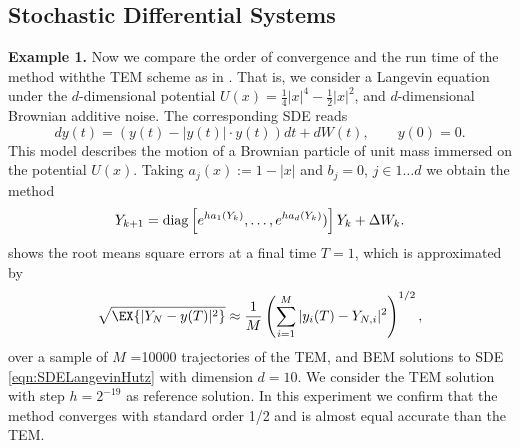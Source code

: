 \subsection{Stochastic Differential Systems}
{\textbf{Example 1.}}
Now we compare the order of convergence
and the run time of the \SM method withthe TEM scheme as in \cite{Hutzenthaler2012a}. That is,
we consider a  Langevin equation under  the $d$-dimensional potential 
$U(x)= \frac{1}{4}|x|^4 - \frac{1}{2}|x|^2$, and $d$-dimensional Brownian additive noise. The corresponding
SDE reads
\begin{equation}\label{eqn:SDELangevinHutz}
dy(t) = 
\left(
y(t) - |y(t)| \cdot y(t)
\right)dt
+dW(t), \qquad y(0)=0.
\end{equation}
This model describes the motion of a Brownian particle of unit mass immersed on the potential $U(x)$. 
Taking $a_j(x):=1-|x|$ and $b_j=0$, $j\in 1\dots d$ we obtain the \SM method
\begin{equation}\label{eqn:LangevinLSMethod}
	Y_{k+1} = \operatorname{diag}
	\left[		
		e^{h a_1(Y_k)}, \dots, e^{ha_d(Y_k)}) 
	\right] 
	Y_k+
		\Delta W_k.
\end{equation}
 shows the root means square errors at a final time $T=1$, which is approximated by
	\begin{equation}
		\sqrt{\EX{|Y_N - y(T)|^2}} \approx 
		\frac{1}{M}
		\left(
			\sum_{i=1}^M
			|y_i(T) - Y_{N,i}|^2	
		\right)^{1/2},
	\end{equation}
over a sample of $M$ =\num{10000} trajectories of the TEM, \SM  and BEM solutions to SDE \eqref{eqn:SDELangevinHutz} 
with dimension $d=10$.  We consider the TEM solution with step $h=2^{-19}$ as reference solution. 
In this experiment we confirm that the \SM method converges with standard order 1/2  and is almost equal accurate than 
the TEM.

